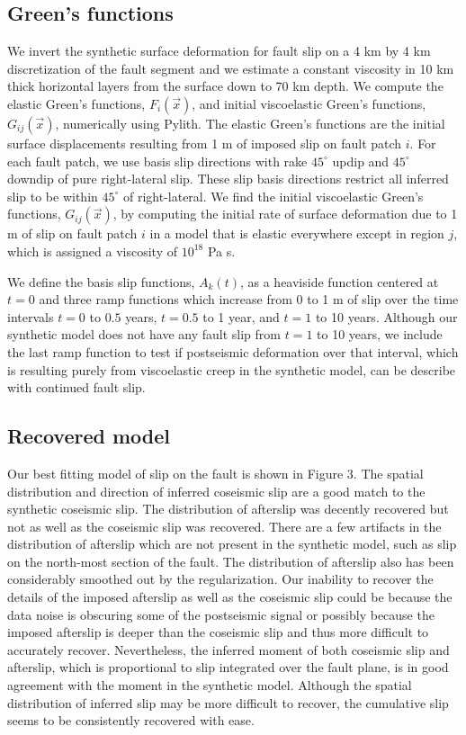 \documentclass[extra]{gji}
\begin{document}
\subsection{Green's functions}

We invert the synthetic surface deformation for fault slip on a 4 km
by 4 km discretization of the fault segment and we estimate a constant
viscosity in 10 km thick horizontal layers from the surface down to 70
km depth. We compute the elastic Green's functions, $F_i(\vec{x})$,
and initial viscoelastic Green's functions, $G_{ij}(\vec{x})$,
numerically using Pylith.  The elastic Green's functions are the
initial surface displacements resulting from 1 m of imposed slip on
fault patch $i$.  For each fault patch, we use basis slip directions
with rake $45^\circ$ updip and $45^\circ$ downdip of pure
right-lateral slip.  These slip basis directions restrict all inferred
slip to be within $45^\circ$ of right-lateral. We find the initial
viscoelastic Green's functions, $G_{ij}(\vec{x})$, by computing the
initial rate of surface deformation due to 1 m of slip on fault
patch $i$ in a model that is elastic everywhere except in region $j$,
which is assigned a viscosity of $10^{18}$ Pa s.

We define the basis slip functions, $A_k(t)$, as a heaviside function
centered at $t=0$ and three ramp functions which increase from 0 to 1
m of slip over the time intervals $t=0$ to $0.5$ years, $t=0.5$ to 1
year, and $t=1$ to 10 years.  Although our synthetic model does not
have any fault slip from $t=1$ to 10 years, we include the last
ramp function to test if postseismic deformation over that interval,
which is resulting purely from viscoelastic creep in the synthetic
model, can be describe with continued fault slip.

\subsection{Recovered model}

Our best fitting model of slip on the fault is shown in Figure 3.  The
spatial distribution and direction of inferred coseismic slip are a
good match to the synthetic coseismic slip.  The distribution of
afterslip was decently recovered but not as well as the coseismic slip
was recovered.  There are a few artifacts in the distribution of
afterslip which are not present in the synthetic model, such as slip
on the north-most section of the fault.  The distribution of afterslip
also has been considerably smoothed out by the regularization. Our
inability to recover the details of the imposed afterslip as well as
the coseismic slip could be because the data noise is obscuring some
of the postseismic signal or possibly because the imposed afterslip is
deeper than the coseismic slip and thus more difficult to accurately
recover.  Nevertheless, the inferred moment of both coseismic slip and
afterslip, which is proportional to slip integrated over the fault
plane, is in good agreement with the moment in the synthetic model.
Although the spatial distribution of inferred slip may be more
difficult to recover, the cumulative slip seems to be consistently
recovered with ease.
\end{document}
